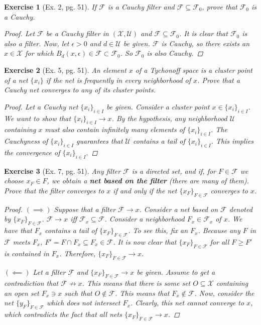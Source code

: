 \documentclass[11pt]{article}
\newtheorem{exercise}{Exercise}
\newcommand{\F}{\mathcal{F}}
\newcommand{\X}{\mathcal{X}}
\begin{document}
\begin{exercise}[Ex. 2, pg. 51]
	If $\F$ is a Cauchy filter and $\F \subseteq \F_0$, prove that $\F_0$ is a Cauchy.

	\begin{proof}
		Let $\F$ be a Cauchy filter in $(\X,\mathcal{U})$ and $\F \subseteq \F_0$. It is clear that $\F_0$ is also a filter. Now, let $\epsilon > 0$ and $d\in \mathcal{U}$ be given. $\F$ is Cauchy, so there exists an $x\in \X$ for which $B_d(x,\epsilon) \in \F \subset \F_0$. So $\F_0$ is also Cauchy. 
	\end{proof}
\end{exercise}

\begin{exercise}[Ex. 5, pg. 51]
	An element $x$ of a Tychonoff space is a cluster point of a net $\{x_i\}$ if the net is frequently in every neighborhood of $x$. Prove that a Cauchy net converges to any of its cluster points.
	\begin{proof}
		Let a Cauchy net $\{ x_i\}_{i\in I}$ be given. Consider a cluster point $x\in \{ x_i\}_{i\in I}$. We want to show that $\{x_i\}_{i\in I} \to x$. By the hypothesis, any neighborhood $\mathcal{U}$ containing $x$ must also contain infinitely many elements of $\{x_i\}_{i\in I}$. The Cauchyness of $\{x_i\}_{i\in I}$ guarantees that $\mathcal{U}$ contains a tail of $\{x_i\}_{i\in I}$. This implies the convergence of $\{x_i\}_{i\in I}$.  
	\end{proof}
\end{exercise}

\begin{exercise}[Ex. 7, pg. 51]
	Any filter $\F$ is a directed set, and if, for $F \in \F$ we choose $x_F \in F$, we obtain a \textbf{net based on the filter} (there are many of them). Prove that the filter converges to $x$ if and only if the net $\{x_F\}_{F\in \F}$ converges to $x$.
	\begin{proof}
		$(\implies)$ Suppose that a filter $\F\to x$. Consider a net based on $\F$ denoted by $\{x_F\}_{F\in \F}$. $\F \to x$ iff $\F_x \subseteq \F$. Consider a neighborhood $F_x \in \F_x$ of $x$. We have that $F_x$ contains a tail of $\{x_F\}_{F\in \F}$. To see this, fix an $F_x$. Because any $F$ in $\F$ meets $F_x$, $F' = F\cap F_x \subseteq F_x \in \F$. It is now clear that $\{ x_{F}\}_{F\in \F}$ for all $F \geq F'$ is contained in $F_x$. Therefore, $\{x_F\}_{F\in \F} \to x$.  
		
		$(\impliedby)$ Let a filter $\F$ and $\{x_F\}_{F\in \F} \to x$ be given. Assume to get a contradiction that $\F \not\to x$. This means that there is some set $O\subseteq \X$ containing an open set $F_x \ni x$ such that $O \notin \F$. This means that $F_x \notin \F$. Now, consider the net $\{ y_F\}_{F\in \F}$ which does not intersect $F_x$. Clearly, this net cannot converge to $x$, which contradicts the fact that all nets $\{x_F\}_{F\in \F} \to x$.
	\end{proof}
\end{exercise}
\end{document}
